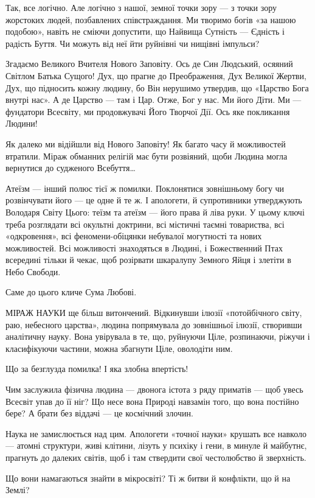 Так, все логічно. Але логічно з нашої, земної точки зору — з точки зору
жорстоких людей, позбавлених співстраждання. Ми творимо богів «за нашою
подобою», навіть не сміючи допустити, що Найвища Сутність — Єдність і радість
Буття. Чи можуть від неї йти руйнівні чи нищівні імпульси?

Згадаємо Великого Вчителя Нового Заповіту. Ось де Син Людський, осяяний Світлом
Батька Сущого! Дух, що прагне до Преображення, Дух Великої Жертви, Дух, що
підносить кожну людину, бо Він нерушимо утвердив, що «Царство Бога внутрі нас».
А де Царство — там і Цар. Отже, Бог у нас. Ми його Діти. Ми — фундатори
Всесвіту, ми продовжувачі Його Творчої Дії. Ось яке покликання Людини!

Як далеко ми відійшли від Нового Заповіту! Як багато часу й можливостей
втратили. Міраж обманних релігій має бути розвіяний, щоби Людина могла
вернутися до судженого Всебуття…

Атеїзм — інший полюс тієї ж помилки. Поклонятися зовнішньому богу чи
розвінчувати його — це одне й те ж. І апологети, й супротивники утверджують
Володаря Світу Цього: теїзм та атеїзм — його права й ліва руки. У цьому ключі
треба розглядати всі окультні доктрини, всі містичні таємні товариства, всі
«одкровення», всі феномени-обіцянки небувалої могутності та нових можливостей.
Всі можливості знаходяться в Людині, і Божественний Птах всередині тільки й
чекає, щоб розірвати шкаралупу Земного Яйця і злетіти в Небо Свободи.

Саме до цього кличе Сума Любові.

МІРАЖ НАУКИ ще більш витончений. Відкинувши ілюзії «потойбічного світу, раю,
небесного царства», людина попрямувала до зовнішньої ілюзії, створивши
аналітичну науку. Вона увірувала в те, що, руйнуючи Ціле, розпинаючи, ріжучи і
класифікуючи частини, можна збагнути Ціле, оволодіти ним.


Що за безглузда помилка! І яка злобна впертість!

Чим заслужила фізична людина — двонога істота з ряду приматів — щоб увесь
Всесвіт упав до її ніг? Що несе вона Природі навзамін того, що вона постійно
бере? А брати без віддачі — це космічний злочин.

Наука не замислюється над цим. Апологети «точної науки» крушать все навколо —
атомні структури, живі клітини, лізуть у психіку і гени, в минуле й майбутнє,
прагнуть до далеких світів, щоб і там ствердити свої честолюбство й зверхність.

Що вони намагаються знайти в мікросвіті? Ті ж битви й конфлікти, що й на Землі?

